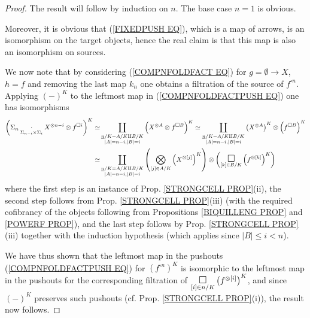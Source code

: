 \documentclass[a4paper,10pt]{article}%
\begin{document}
\begin{proof}
  The result will follow by induction on $n$. The base case $n=1$ is obvious.

  Moreover, it is obvious that (\ref{FIXEDPUSH EQ}), which is a map of arrows, is an isomorphism on the target objects, hence the real claim is that this map is also an isomorphism on sources.

  We now note that by considering (\ref{COMPNFOLDFACT EQ}) for
  $g=\emptyset \to X$, $h=f$ and removing the last map $k_n$
  one obtains a filtration of the source of $f^{\square n}$.
  Applying $(\minus)^K$ to the leftmost map in 
  (\ref{COMPNFOLDFACTPUSH EQ})
  one has isomorphisms
  \begin{align*}
    \left(
      \Sigma_n \underset{\Sigma_{n-i} \times \Sigma_i}
      {\cdot} X^{\otimes n-i} \otimes f^{\square i}
    \right)^K
    \simeq &
    \coprod_{\substack{\underline{n}/K=A/K \amalg B/K \\
	|A|=n-i,|B|=i}}
    \left( X^{\otimes A} \otimes f^{\square B} \right)^K
    \simeq
    \coprod_{\substack{\underline{n}/K=A/K \amalg B/K \\
	|A|=n-i,|B|=i}} 
    \left( X^{\otimes A}\right)^K \otimes \left( f^{\square B} \right)^K
    \\
    \simeq &
    \coprod_{\substack{\underline{n}/K=A/K \amalg B/K \\
	|A|=n-i,|B|=i}} 
    \left(
      \bigotimes_{[j]\in A/K}\left( X^{\otimes [j]}\right)^K
    \right)
    \otimes 
    \left(
      \underset{[k] \in B/K}
      {\mathlarger{\mathlarger{\square}}}
      \left(  f^{\otimes [k]} \right)^K
    \right)
  \end{align*}
  where the first step is an instance of Prop. \ref{STRONGCELL PROP}(ii), 
  the second step follows from Prop. \ref{STRONGCELL PROP}(iii)
  (with the required cofibrancy of the objects following from Propositions \ref{BIQUILLENG PROP} and \ref{POWERF PROP}),
  and the last step follows by Prop. \ref{STRONGCELL PROP}(iii) together with the induction hypothesis (which applies since $|B|\leq i <n$).


  We have thus shown that the leftmost map in the pushouts (\ref{COMPNFOLDFACTPUSH EQ}) for 
  $\left( f^{\square n} \right)^K$
  is isomorphic to the leftmost map in the pushouts for the corresponding filtration of 	
  $\underset{[i] \in n/K}{\mathlarger{\mathlarger{\square}}}
  \left( f^{\otimes [i]} \right)^K$,
  and since $(\minus)^K$ preserves such pushouts (cf. Prop. \ref{STRONGCELL PROP}(i)), the result now follows.
\end{proof}
\end{document}
